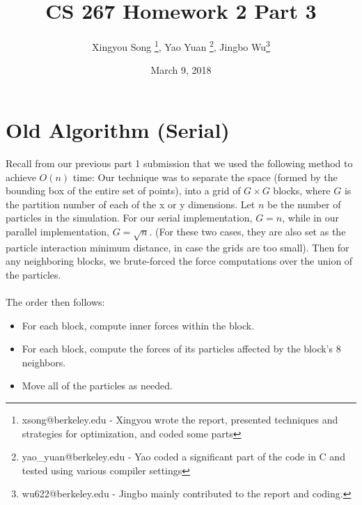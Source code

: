 \documentclass[12pt]{article}
\begin{document}
 
 

\title{CS 267 Homework 2 Part 3}
\author{Xingyou Song \footnote{xsong@berkeley.edu - Xingyou wrote the report, presented techniques and strategies for optimization, and coded some parts}, Yao Yuan \footnote{yao\_yuan@berkeley.edu - Yao coded a significant part of the code in C and tested using various compiler settings}, Jingbo Wu\footnote{wu622@berkeley.edu - Jingbo mainly contributed to the report and coding.}} %
\date{March 9, 2018} 
\maketitle

\section{Old Algorithm (Serial)}
Recall from our previous part 1 submission that we used the following method to achieve $O(n)$ time: Our technique was to separate the space (formed by the bounding box of the entire set of points), into a grid of $G \times G$ blocks, where $G$ is the partition number of each of the x or y dimensions. Let $n$ be the number of particles in the simulation. For our serial implementation, $G = n$, while in our parallel implementation, $G = \sqrt{n}$. (For these two cases, they are also set as the particle interaction minimum distance, in case the grids are too small). Then for any neighboring blocks, we brute-forced the force computations over the union of the particles. \\\\
The order then follows: 
\begin{itemize}
  \item For each block, compute inner forces within the block.
  \item For each block, compute the forces of its particles affected by the block's 8 neighbors.
  \item Move all of the particles as needed. 
\end{itemize}
\end{document}
